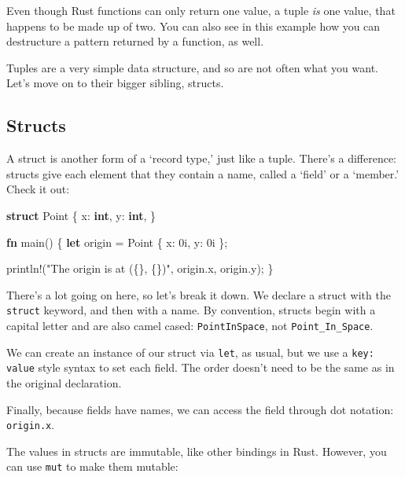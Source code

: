 \documentclass[]{article}
\newenvironment{Shaded}{}{}
\newcommand{\KeywordTok}[1]{\textcolor[rgb]{0.00,0.44,0.13}{\textbf{{#1}}}}
\newcommand{\DecValTok}[1]{\textcolor[rgb]{0.25,0.63,0.44}{{#1}}}
\newcommand{\StringTok}[1]{\textcolor[rgb]{0.25,0.44,0.63}{{#1}}}
\newcommand{\OtherTok}[1]{\textcolor[rgb]{0.00,0.44,0.13}{{#1}}}
\newcommand{\NormalTok}[1]{{#1}}
\begin{document}
Even though Rust functions can only return one value, a tuple \emph{is}
one value, that happens to be made up of two. You can also see in this
example how you can destructure a pattern returned by a function, as
well.

Tuples are a very simple data structure, and so are not often what you
want. Let's move on to their bigger sibling, structs.

\subsection{Structs}\label{structs}

A struct is another form of a `record type,' just like a tuple. There's
a difference: structs give each element that they contain a name, called
a `field' or a `member.' Check it out:

\begin{Shaded}
\begin{Highlighting}[]
\KeywordTok{struct} \NormalTok{Point \{}
    \NormalTok{x: }\KeywordTok{int}\NormalTok{,}
    \NormalTok{y: }\KeywordTok{int}\NormalTok{,}
\NormalTok{\}}

\KeywordTok{fn} \NormalTok{main() \{}
    \KeywordTok{let} \NormalTok{origin = Point \{ x: }\DecValTok{0i}\NormalTok{, y:  }\DecValTok{0i} \NormalTok{\};}

    \OtherTok{println!}\NormalTok{(}\StringTok{"The origin is at (\{\}, \{\})"}\NormalTok{, origin.x, origin.y);}
\NormalTok{\}}
\end{Highlighting}
\end{Shaded}

There's a lot going on here, so let's break it down. We declare a struct
with the \texttt{struct} keyword, and then with a name. By convention,
structs begin with a capital letter and are also camel cased:
\texttt{PointInSpace}, not \texttt{Point\_In\_Space}.

We can create an instance of our struct via \texttt{let}, as usual, but
we use a \texttt{key: value} style syntax to set each field. The order
doesn't need to be the same as in the original declaration.

Finally, because fields have names, we can access the field through dot
notation: \texttt{origin.x}.

The values in structs are immutable, like other bindings in Rust.
However, you can use \texttt{mut} to make them mutable:
\end{document}
